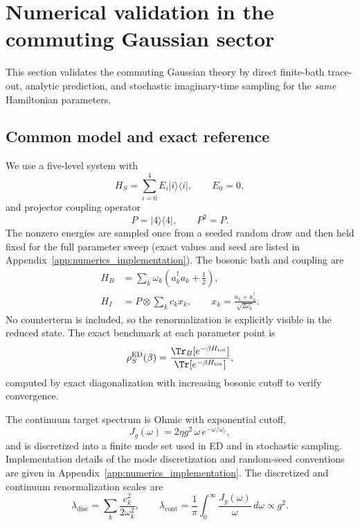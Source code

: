 \section{Numerical validation in the commuting Gaussian sector}
\label{sec:numerical}

This section validates the commuting Gaussian theory by direct finite-bath trace-out,
analytic prediction, and stochastic imaginary-time sampling for the \emph{same}
Hamiltonian parameters.

\subsection{Common model and exact reference}

We use a five-level system with
\begin{equation}
H_S=\sum_{i=0}^{4}E_i\lvert i\rangle\!\langle i\rvert,\qquad E_0=0,
\end{equation}
and projector coupling operator
\begin{equation}
P=\lvert 4\rangle\!\langle 4\rvert,\qquad P^2=P.
\end{equation}
The nonzero energies are sampled once from a seeded random draw and then held
fixed for the full parameter sweep (exact values and seed are listed in
Appendix~\ref{app:numerics_implementation}). The bosonic bath and coupling are
\begin{align}
H_B &= \sum_k\omega_k\!\left(a_k^\dagger a_k+\tfrac12\right),\\
H_I &= P\otimes\sum_k c_k x_k,\qquad
x_k=\frac{a_k+a_k^\dagger}{\sqrt{2\omega_k}}.
\end{align}
No counterterm is included, so the renormalization is explicitly visible in
the reduced state. The exact benchmark at each parameter point is
\begin{equation}
\rho_S^{\mathrm{ED}}(\beta)
=
\frac{\Tr_B[e^{-\beta H_{\mathrm{tot}}}]}{\Tr[e^{-\beta H_{\mathrm{tot}}}]},
\label{eq:rho_ed_definition}
\end{equation}
computed by exact diagonalization with increasing bosonic cutoff to verify
convergence.

The continuum target spectrum is Ohmic with exponential cutoff,
\begin{equation}
J_g(\omega)=2\eta g^2\,\omega\,e^{-\omega/\omega_c},
\end{equation}
and is discretized into a finite mode set used in ED and in stochastic sampling.
Implementation details of the mode discretization and random-seed conventions
are given in Appendix~\ref{app:numerics_implementation}.
The discretized and continuum renormalization scales are
\begin{equation}
\lambda_{\mathrm{disc}}
=
\sum_k\frac{c_k^2}{2\omega_k^2},
\qquad
\lambda_{\mathrm{cont}}
=
\frac{1}{\pi}\int_0^\infty\frac{J_g(\omega)}{\omega}\,d\omega
\propto g^2.
\label{eq:lambda_defs}
\end{equation}

